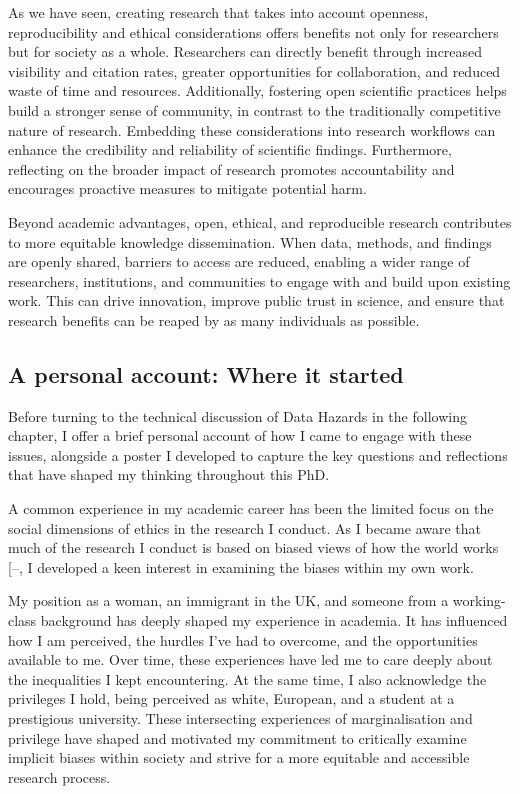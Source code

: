 \documentclass[
  11pt,
  letterpaper,
]{scrreprt}
\begin{document}
As we have seen, creating research that takes into account openness,
reproducibility and ethical considerations offers benefits not only for
researchers but for society as a whole. Researchers can directly benefit
through increased visibility and citation rates, greater opportunities
for collaboration, and reduced waste of time and resources.
Additionally, fostering open scientific practices helps build a stronger
sense of community, in contrast to the traditionally competitive nature
of research. Embedding these considerations into research workflows can
enhance the credibility and reliability of scientific findings.
Furthermore, reflecting on the broader impact of research promotes
accountability and encourages proactive measures to mitigate potential
harm.

Beyond academic advantages, open, ethical, and reproducible research
contributes to more equitable knowledge dissemination. When data,
methods, and findings are openly shared, barriers to access are reduced,
enabling a wider range of researchers, institutions, and communities to
engage with and build upon existing work. This can drive innovation,
improve public trust in science, and ensure that research benefits can
be reaped by as many individuals as possible.

\subsection{A personal account: Where it
started}\label{a-personal-account-where-it-started}

Before turning to the technical discussion of Data Hazards in the
following chapter, I offer a brief personal account of how I came to
engage with these issues, alongside a poster I developed to capture the
key questions and reflections that have shaped my thinking throughout
this PhD.

A common experience in my academic career has been the limited focus on
the social dimensions of ethics in the research I conduct. As I became
aware that much of the research I conduct is based on biased views of
how the world works
{[}--\citeproc{ref-ross2020Everyday}{423}{]},
I developed a keen interest in examining the biases within my own work.

My position as a woman, an immigrant in the UK, and someone from a
working-class background has deeply shaped my experience in academia. It
has influenced how I am perceived, the hurdles I've had to overcome, and
the opportunities available to me. Over time, these experiences have led
me to care deeply about the inequalities I kept encountering. At the
same time, I also acknowledge the privileges I hold, being perceived as
white, European, and a student at a prestigious university. These
intersecting experiences of marginalisation and privilege have shaped
and motivated my commitment to critically examine implicit biases within
society and strive for a more equitable and accessible research process.
\end{document}
